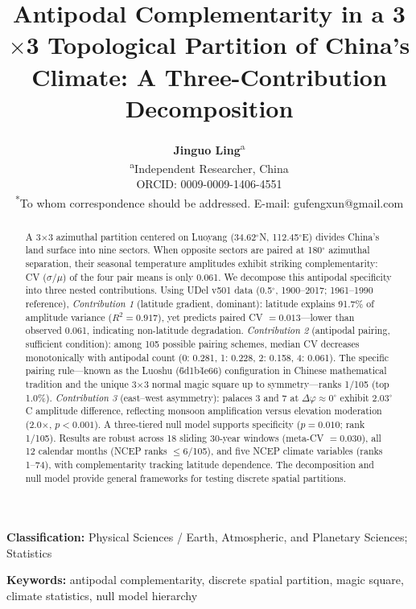 \documentclass[9pt,twocolumn]{article}
\title{\textbf{Antipodal Complementarity in a 3$\times$3 Topological Partition of China's Climate: A Three-Contribution Decomposition}}
\author{
\textbf{Jinguo Ling}\textsuperscript{a}
\\[6pt]
\textsuperscript{a}Independent Researcher, China\\[3pt]
ORCID: 0009-0009-1406-4551\\[3pt]
\textsuperscript{*}To whom correspondence should be addressed. E-mail: gufengxun@gmail.com
}
\date{}
\begin{document}
\maketitle

\noindent\textbf{Classification:} Physical Sciences / Earth, Atmospheric, and Planetary Sciences; Statistics

\noindent\textbf{Keywords:} antipodal complementarity, discrete spatial partition, magic square, climate statistics, null model hierarchy

\vspace{6pt}

\begin{abstract}
A 3$\times$3 azimuthal partition centered on Luoyang (34.62$^\circ$N, 112.45$^\circ$E) divides China's land surface into nine sectors. When opposite sectors are paired at 180$^\circ$ azimuthal separation, their seasonal temperature amplitudes exhibit striking complementarity: CV ($\sigma/\mu$) of the four pair means is only 0.061. We decompose this antipodal specificity into three nested contributions. Using UDel v501 data (0.5$^\circ$, 1900--2017; 1961--1990 reference), \textit{Contribution 1} (latitude gradient, dominant): latitude explains 91.7\% of amplitude variance ($R^2 = 0.917$), yet predicts paired CV $= 0.013$---lower than observed 0.061, indicating non-latitude degradation. \textit{Contribution 2} (antipodal pairing, sufficient condition): among 105 possible pairing schemes, median CV decreases monotonically with antipodal count (0: 0.281, 1: 0.228, 2: 0.158, 4: 0.061). The specific pairing rule---known as the Luoshu (\u6d1b\u4e66) configuration in Chinese mathematical tradition and the unique 3$\times$3 normal magic square up to symmetry---ranks 1/105 (top 1.0\%). \textit{Contribution 3} (east--west asymmetry): palaces 3 and 7 at $\Delta\varphi \approx 0^\circ$ exhibit 2.03$^\circ$C amplitude difference, reflecting monsoon amplification versus elevation moderation (2.0$\times$, $p < 0.001$). A three-tiered null model supports specificity ($p = 0.010$; rank 1/105). Results are robust across 18 sliding 30-year windows (meta-CV $= 0.030$), all 12 calendar months (NCEP ranks $\leq$6/105), and five NCEP climate variables (ranks 1--74), with complementarity tracking latitude dependence. The decomposition and null model provide general frameworks for testing discrete spatial partitions.
\end{abstract}
\end{document}
